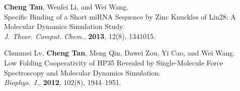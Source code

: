 \begin{cventries}
{\begin{cvitems}
    \item \textbf{Cheng Tan}, Wenfei Li, and Wei Wang.\\
      {\color{awesome} Specific Binding of a Short miRNA Sequence by Zinc Knuckles of Lin28: A
      Molecular Dynamics Simulation Study.} \\
      \textit{J. Theor. Comput. Chem.}, \textbf{2013}, 12(8), 1341015. \\[-6pt]
    \item Chunmei Lv, \textbf{Cheng Tan}, Meng Qin, Dawei Zou, Yi Cao, and Wei Wang.\\
      {\color{awesome} Low Folding Cooperativity of HP35 Revealed by Single-Molecule Force
      Spectroscopy and Molecular Dynamics Simulation.} \\
      \textit{Biophys. J.}, \textbf{2012}, 102(8), 1944--1951. \\[-6pt]
    \end{cvitems}
  }

\end{cventries}
